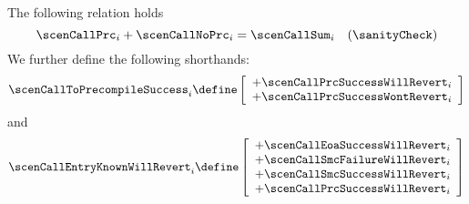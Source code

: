 \saNote{}
The following relation holds
\[
	\scenCallPrc _{i} + \scenCallNoPrc _{i} = \scenCallSum _{i} \quad (\sanityCheck)
\]
We further define the following shorthands:
\[
	\scenCallToPrecompileSuccess _{i} \define
	 \left[ \begin{array}{l}
		+ \scenCallPrcSuccessWillRevert        _{i}    \\
		+ \scenCallPrcSuccessWontRevert        _{i}    \\
	\end{array} \right]
\]
and
\[
	\scenCallEntryKnownWillRevert _{i} \define
	 \left[ \begin{array}{l}
		+ \scenCallEoaSuccessWillRevert               _{i}    \\
		+ \scenCallSmcFailureWillRevert        _{i}    \\
		+ \scenCallSmcSuccessWillRevert        _{i}    \\
		+ \scenCallPrcSuccessWillRevert        _{i}    \\
	\end{array} \right]
\]
